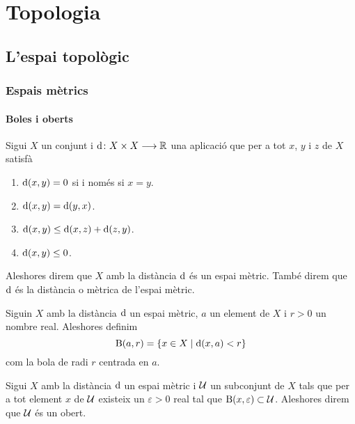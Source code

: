 \documentclass[../Apunts.tex]{subfiles}
\begin{document}
\part{Topologia}
\chapter{L'espai topològic}
	\section{Espais mètrics}
	\subsection{Boles i oberts}
	\begin{definition}
		\label{def:espai mètric}
		\label{def:distància}
		Sigui \(X\) un conjunt i \(\operatorname{d}\colon X\times X\longrightarrow\mathbb{R}\) una aplicació que per a tot \(x\), \(y\) i \(z\) de \(X\) satisfà
		\begin{enumerate}
			\item \(\operatorname{d}(x,y)=0\) si i només si \(x=y\).
			\item \(\operatorname{d}(x,y)=\operatorname{d}(y,x)\).
			\item \(\operatorname{d}(x,y)\leq\operatorname{d}(x,z)+\operatorname{d}(z,y)\).
			\item \(\operatorname{d}(x,y)\leq0\).
		\end{enumerate}
		Aleshores direm que \(X\) amb la distància \(\operatorname{d}\) és un espai mètric. També direm que \(\operatorname{d}\) és la distància o mètrica de l'espai mètric.
	\end{definition}
	\begin{definition}[Bola]
		\label{def:bola}
		Siguin \(X\) amb la distància \(\operatorname{d}\) un espai mètric, \(a\) un element de \(X\) i \(r>0\) un nombre real. Aleshores definim
		\[\operatorname{B}(a,r)=\{x\in X\mid\operatorname{d}(x,a)<r\}\]
		com la bola de radi \(r\) centrada en \(a\).
	\end{definition}
	\begin{definition}[Obert]
		\label{def:obert espai mètric}
		Sigui \(X\) amb la distància \(\operatorname{d}\) un espai mètric i \(\mathcal{U}\) un subconjunt de \(X\) tals que per a tot element \(x\) de \(\mathcal{U}\) existeix un \(\varepsilon>0\) real tal que \(\operatorname{B}(x,\varepsilon)\subset\mathcal{U}\). Aleshores direm que \(\mathcal{U}\) és un obert.
	\end{definition}
\end{document}
